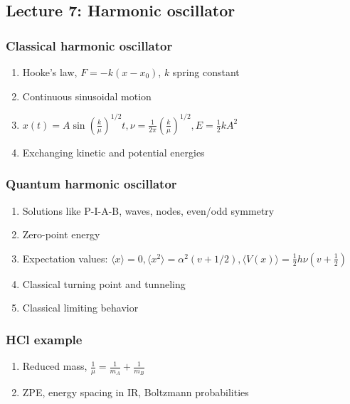 \documentclass[11pt]{article}
\begin{document}
\subsection{Lecture 7: Harmonic oscillator}
\label{sec:org7a04c6c}
\subsubsection{Classical harmonic oscillator}
\label{sec:orgc095181}
\begin{enumerate}
\item Hooke's law, \(F=-k(x-x_0)\), \(k\) spring constant
\item Continuous sinusoidal motion
\item \(x(t)=A \sin(\frac{k}{\mu})^{1/2}t, \nu=\frac{1}{2\pi}(\frac{k}{\mu})^{1/2}, E=\frac{1}{2}kA^2\)
\item Exchanging kinetic and potential energies
\end{enumerate}
\subsubsection{Quantum harmonic oscillator}
\label{sec:orgeac7405}
\begin{enumerate}
\item Solutions like P-I-A-B, waves, nodes, even/odd symmetry
\item Zero-point energy
\item Expectation values: \(\langle x \rangle =0, \langle x^2 \rangle =
      \alpha^2 (v+1/2), \langle V(x) \rangle = \frac{1}{2} h\nu (v+\frac{1}{2})\)
\item Classical turning point and tunneling
\item Classical limiting behavior
\end{enumerate}
\subsubsection{HCl example}
\label{sec:org614d621}
\begin{enumerate}
\item Reduced mass, \(\frac{1}{\mu}=\frac{1}{m_A}+\frac{1}{m_B}\)
\item ZPE, energy spacing in IR, Boltzmann probabilities
\end{enumerate}
\end{document}
